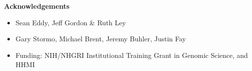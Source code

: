 \documentclass[landscape]{slides}
\begin{document}
\begin{slide}

\large
\begin{center}
\large{\textbf{Acknowledgements}}
\end{center}

\small

\begin{itemize}
\item
  Sean Eddy, Jeff Gordon \& Ruth Ley 
\item
  Gary Stormo, Michael Brent, Jeremy Buhler, Justin Fay 
\item
  Funding: NIH/NHGRI Institutional Training Grant in Genomic Science,
  and HHMI
\end{itemize}

\vspace{1in}

\vfill
\end{slide}
\end{document}
